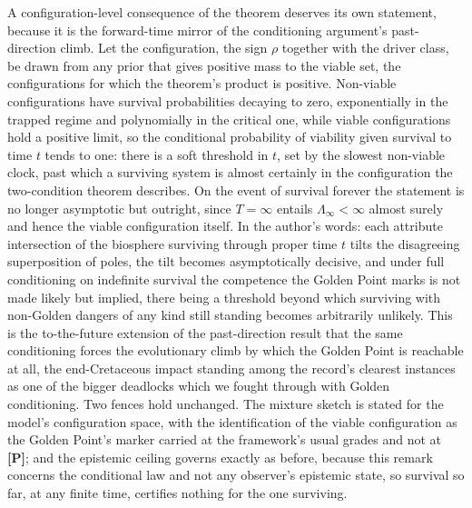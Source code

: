 \begin{remark}\label{gr1:rem:forwardforcing}
A configuration-level consequence of the theorem deserves its own
statement, because it is the forward-time mirror of the conditioning
argument's past-direction climb. Let the configuration, the sign
$\rho$ together with the driver class, be drawn from any prior that
gives positive mass to the viable set, the configurations for which
the theorem's product is positive. Non-viable configurations have
survival probabilities decaying to zero, exponentially in the trapped
regime and polynomially in the critical one, while viable
configurations hold a positive limit, so the conditional probability
of viability given survival to time $t$ tends to one: there is a soft
threshold in $t$, set by the slowest non-viable clock, past which a
surviving system is almost certainly in the configuration the
two-condition theorem describes. On the event of survival forever the
statement is no longer asymptotic but outright, since $T=\infty$
entails $\Lambda_\infty<\infty$ almost surely and hence the viable
configuration itself. In the author's words: each attribute
intersection of the biosphere surviving through proper time $t$ tilts
the disagreeing superposition of poles, the tilt becomes
asymptotically decisive, and under full conditioning on indefinite
survival the competence the Golden Point marks is not made likely but
implied, there being a threshold beyond which surviving with
non-Golden dangers of any kind still standing becomes arbitrarily
unlikely. This is the to-the-future extension of the past-direction
result that the same conditioning forces the evolutionary climb by
which the Golden Point is reachable at all, the end-Cretaceous impact
standing among the record's clearest instances as one of the bigger
deadlocks which we fought through with Golden conditioning. Two fences hold
unchanged. The mixture sketch is stated for the model's configuration
space, with the identification of the viable configuration as the
Golden Point's marker carried at the framework's usual grades and not
at \textbf{[P]}; and the epistemic ceiling governs exactly as before,
because this remark concerns the conditional law and not any
observer's epistemic state, so survival so far, at any finite time,
certifies nothing for the one surviving.
\end{remark}

